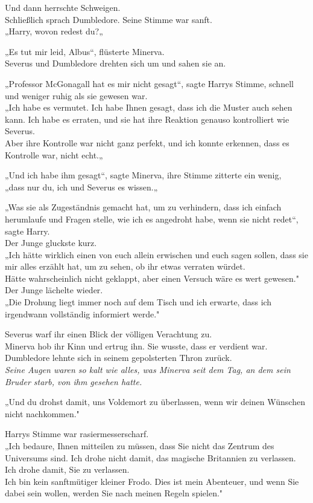 {Und dann herrschte Schweigen.\\ Schließlich sprach Dumbledore. Seine Stimme war sanft.\\ „Harry, wovon redest du?„

„Es tut mir leid, Albus“, flüsterte Minerva.\\ Severus und Dumbledore drehten sich um und sahen sie an.

„Professor McGonagall hat es mir nicht gesagt“, sagte Harrys Stimme, schnell und weniger ruhig als sie gewesen war.\\ „Ich habe es vermutet. Ich habe Ihnen gesagt, dass ich die Muster auch sehen kann. Ich habe es erraten, und sie hat ihre Reaktion genauso kontrolliert wie Severus.\\ Aber ihre Kontrolle war nicht ganz perfekt, und ich konnte erkennen, dass es Kontrolle war, nicht echt.„

„Und ich habe ihm gesagt“, sagte Minerva, ihre Stimme zitterte ein wenig,\\ „dass nur du, ich und Severus es wissen.„

„Was sie als Zugeständnis gemacht hat, um zu verhindern, dass ich einfach herumlaufe und Fragen stelle, wie ich es angedroht habe, wenn sie nicht redet“, sagte Harry.\\ Der Junge gluckste kurz.\\ „Ich hätte wirklich einen von euch allein erwischen und euch sagen sollen, dass sie mir alles erzählt hat, um zu sehen, ob ihr etwas verraten würdet.\\ Hätte wahrscheinlich nicht geklappt, aber einen Versuch wäre es wert gewesen."\\ Der Junge lächelte wieder.\\ „Die Drohung liegt immer noch auf dem Tisch und ich erwarte, dass ich irgendwann vollständig informiert werde."

Severus warf ihr einen Blick der völligen Verachtung zu.\\ Minerva hob ihr Kinn und ertrug ihn. Sie wusste, dass er verdient war.\\ Dumbledore lehnte sich in seinem gepolsterten Thron zurück.\\ \emph{Seine Augen waren so kalt wie alles, was Minerva seit dem Tag, an dem sein Bruder starb, von ihm gesehen hatte.}

„Und du drohst damit, uns Voldemort zu überlassen, wenn wir deinen Wünschen nicht nachkommen."

Harrys Stimme war rasiermesserscharf.\\ „Ich bedaure, Ihnen mitteilen zu müssen, dass Sie nicht das Zentrum des Universums sind. Ich drohe nicht damit, das magische Britannien zu verlassen. Ich drohe damit, Sie zu verlassen.\\ Ich bin kein sanftmütiger kleiner Frodo. Dies ist mein Abenteuer, und wenn Sie dabei sein wollen, werden Sie nach meinen Regeln spielen."

}
